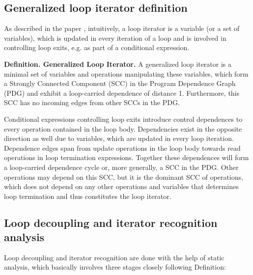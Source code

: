 \subsection{Generalized loop iterator definition}
\qquad As described in the paper \cite{iterator-recognition-paper}, intuitively, a loop iterator is a variable (or a set of variables),
which is updated in every iteration of a loop and is involved in controlling loop exits, e.g. as part of a conditional expression.\newline

\textbf{Definition. Generalized Loop Iterator.} A generalized loop iterator is a minimal set of variables and operations manipulating these variables, which form a Strongly Connected Component (SCC) in the Program Dependence Graph (PDG) and exhibit a loop-carried dependence of distance 1. Furthermore, this SCC has no incoming edges from other SCCs in the PDG.

\null\qquad Conditional expressions controlling loop exits introduce control dependences to every operation contained in the loop body. Dependencies exist in the opposite direction as well due to variables, which are updated in every loop iteration. Dependence edges span from update operations in the loop body towards read operations in loop termination expressions. Together these dependences will form a loop-carried dependence cycle or, more generally, a SCC in the PDG. Other operations may depend on this SCC, but it is the dominant SCC of operations, which does not depend on any other operations and variables that determines loop termination and thus constitutes the loop iterator.

\subsection{Loop decoupling and iterator recognition analysis}
\qquad Loop decoupling and iterator recognition are done with the help of static analysis, which basically involves three stages closely following Definition:

